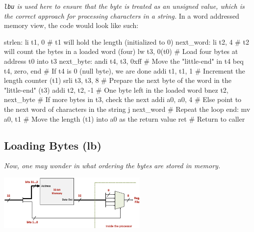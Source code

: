 \textit{\texttt{lbu} is used here to ensure that the byte is treated as an unsigned value, which is the correct approach for processing characters in a string.
}
\newpage
In a word addressed memory view, the code would look like such: \\ \vspace*{5px}
\begin{center}
\begin{assembly}
strlen:
    li t1, 0           # t1 will hold the length (initialized to 0)
next_word:
    li t2, 4           # t2 will count the bytes in a loaded word (four)
    lw t3, 0(t0)       # Load four bytes at address t0 into t3
next_byte:
    andi t4, t3, 0xff  # Move the "little-end" in t4
    beq t4, zero, end  # If t4 is 0 (null byte), we are done
    addi t1, t1, 1     # Increment the length counter (t1)
    srli t3, t3, 8     # Prepare the next byte of the word in the "little-end" (t3)
    addi t2, t2, -1    # One byte left in the loaded word
    bnez t2, next_byte # If more bytes in t3, check the next
    addi a0, a0, 4     # Else point to the next word of characters in the string
    j next_word        # Repeat the loop
end:
    mv a0, t1          # Move the length (t1) into a0 as the return value
    ret                # Return to caller
\end{assembly}
\end{center}
\subsection{Loading Bytes (lb)}
\textit{Now, one may wonder in what ordering the bytes are stored in memory.} \\ \vspace*{5px}
\begin{center}
    \includegraphics[width=0.55\textwidth]{chapters/chapter1c/images/lb.png}
\end{center}
